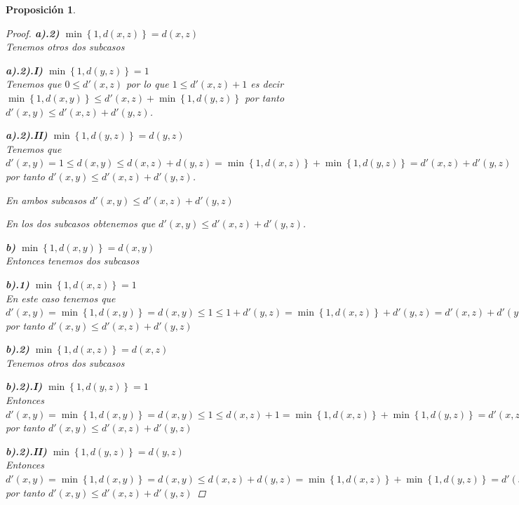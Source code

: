 \documentclass[oneside]{book} %
\theoremstyle{Teorema}
\newtheorem{Proposicion}[Definicion]{Proposición}
\theoremstyle{Ejemplos}
\theoremstyle{[Obs]}
\renewcommand{\{}{\left\lbrace} %
\renewcommand{\}}{\right\rbrace} %
\newcommand{\indentar}[2]{{\setlength{\leftskip}{#1} #2 \setlength{\leftskip}{0cm}}} %
\begin{document}
\begin{Proposicion}
\begin{proof}
{						\textbf{a).2)} $\min\{ 1, d(x, z) \} = d(x, z)$ \\
						Tenemos otros dos subcasos 

						\indentar{1.5cm}{

							\textbf{a).2).I)} $\min\{ 1, d(y, z) \} = 1$ \\
							Tenemos que $0 \leq d'(x, z)$ por lo que $1 \leq d'(x, z) + 1$ es decir $\min\{ 1, d(x, y) \} \leq d'(x, z) + \min\{ 1, d(y, z) \}$ por tanto $d'(x, y) \leq d'(x, z) + d'(y, z)$.

							\textbf{a).2).II)} $\min\{ 1, d(y, z) \} = d(y, z)$ \\
							Tenemos que $d'(x, y) = 1 \leq d(x, y) \leq d(x, z) + d(y, z) = \min\{ 1, d(x, z) \} + \min\{ 1, d(y, z) \} = d'(x, z) + d'(y, z)$ por tanto $d'(x, y) \leq d'(x, z) + d'(y, z)$.
					
						}

						En ambos subcasos $d'(x, y) \leq d'(x, z) + d'(y, z)$

					}

					En los dos subcasos obtenemos que $d'(x, y) \leq d'(x, z) + d'(y, z)$.

					\textbf{b)} $\min\{ 1, d(x, y) \} = d(x, y)$ \\
					Entonces tenemos dos subcasos
					
					\indentar{1cm}{

						\textbf{b).1)} $\min\{ 1, d(x, z) \} = 1$ \\
						En este caso tenemos que $d'(x, y) = \min\{ 1, d(x, y) \} = d(x, y) \leq 1 \leq 1 + d'(y, z) = \min\{ 1, d(x, z) \} + d'(y, z) = d'(x, z) + d'(y, z)$ por tanto $d'(x, y) \leq d'(x, z) + d'(y, z)$

						\textbf{b).2)} $\min\{ 1, d(x, z) \} = d(x, z)$ \\
						Tenemos otros dos subcasos 

						\indentar{1.5cm}{

							\textbf{b).2).I)} $\min\{ 1, d(y, z) \} = 1$ \\
							Entonces $d'(x, y) = \min\{ 1, d(x, y) \} = d(x, y) \leq 1 \leq d(x, z) + 1 = \min\{ 1, d(x, z) \} + \min\{ 1, d(y, z) \} = d'(x, z) + d'(y, z)$ por tanto $d'(x, y) \leq d'(x, z) + d'(y, z)$

							\textbf{b).2).II)} $\min\{ 1, d(y, z) \} = d(y, z)$ \\
							Entonces $d'(x, y) = \min\{ 1, d(x, y) \} = d(x, y) \leq d(x, z) + d(y, z) = \min\{ 1, d(x, z) \} + \min\{ 1, d(y, z) \} = d'(x, z) + d'(y, z)$ por tanto $d'(x, y) \leq d'(x, z) + d'(y, z)$ 

}}
\end{proof}
\end{Proposicion}
\end{document}
